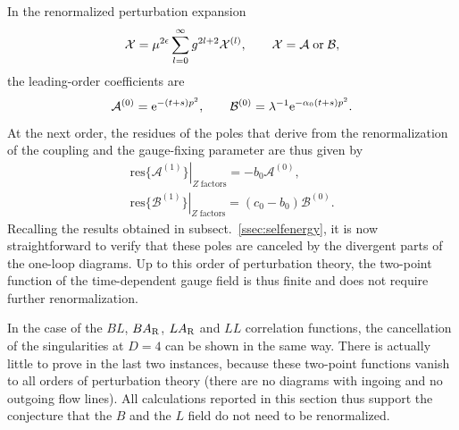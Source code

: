 In the renormalized perturbation expansion
\begin{equation}
   \mathcal{X}=\mu^{2\epsilon}\sum_{l=0}^{\infty}g^{2l+2}\mathcal{X}^{(l)},
   \qquad
   \mathcal{X}=\mathcal{A}\;\hbox{or}\;\mathcal{B},
   \label{eq:5.15}
\end{equation}
the leading-order coefficients are
\begin{equation}
   \mathcal{A}^{(0)}=\mathrm{e}^{-(t+s)p^2},
   \qquad
   \mathcal{B}^{(0)}=\lambda^{-1}\mathrm{e}^{-\alpha_0(t+s)p^2}.
   \label{eq:5.16}
\end{equation}
At the next order, the residues of the poles that
derive from the renormalization of the coupling and the gauge-fixing
parameter are thus given by
\begin{align}
   \left.\mathrm{res}\{\mathcal{A}^{(1)}\}\right|_{Z\;\mathrm{factors}}=
   -b_0\mathcal{A}^{(0)},
   \label{eq:5.17}\\[2.5pt]
   \left.\mathrm{res}\{\mathcal{B}^{(1)}\}\right|_{Z\;\mathrm{factors}}=
   (c_0-b_0)\mathcal{B}^{(0)}.
   \label{eq:5.18}
\end{align}
Recalling the results obtained in subsect.~\ref{ssec:selfenergy},
it is now straightforward to verify that these poles
are canceled by the divergent parts of the one-loop diagrams.
Up to this order of perturbation theory,
the two-point function of the time-dependent gauge field
is thus finite and does not require further renormalization.

In the case of the $BL$, $BA_{\mathrm{R}}$, $LA_{\mathrm{R}}$ and $LL$ correlation
functions, the cancellation of the singularities at $D=4$ can be
shown in the same way. There is actually little to prove in
the last two instances, because these two-point functions vanish
to all orders of perturbation theory (there are no diagrams
with ingoing and no outgoing flow lines). All calculations
reported in this section thus support the conjecture that
the $B$ and the $L$ field do not need to be renormalized.
